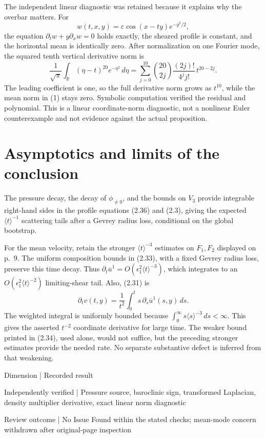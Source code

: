 \documentclass[10pt]{article}
\begin{document}
The independent linear diagnostic was retained because it explains why the overbar matters. For \[w(t,x,y)=\varepsilon\cos(x-ty)e^{-y^2/2},\] the equation \(\partial_tw+y\partial_xw=0\) holds exactly, the sheared profile is constant, and the horizontal mean is identically zero. After normalization on one Fourier mode, the squared tenth vertical derivative norm is \[\frac1{\sqrt\pi}\int_\mathbb R(\eta-t)^{20}e^{-\eta^2}\,d\eta
 =
 \sum_{j=0}^{10}\binom{20}{2j}\frac{(2j)!}{4^j j!}\,t^{20-2j}.\] The leading coefficient is one, so the full derivative norm grows as \(t^{10}\), while the mean norm in (1) stays zero. Symbolic computation verified the residual and polynomial. This is a linear coordinate-norm diagnostic, not a nonlinear Euler counterexample and not evidence against the actual proposition.\par
\section*{Asymptotics and limits of the conclusion}
The pressure decay, the decay of \(\phi_{\ne0}\), and the bounds on \(V_3\) provide integrable right-hand sides in the profile equations (2.36) and (2.3), giving the expected \(\langle t\rangle^{-1}\) scattering tails after a Gevrey radius loss, conditional on the global bootstrap.\par
For the mean velocity, retain the stronger \(\langle t\rangle^{-3}\) estimates on \(F_1,F_2\) displayed on p. 9. The uniform composition bounds in (2.33), with a fixed Gevrey radius loss, preserve this time decay. Thus \(\partial_t\overline u^1=O(\epsilon_1^2\langle t\rangle^{-3})\), which integrates to an \(O(\epsilon_1^2\langle t\rangle^{-2})\) limiting-shear tail. Also, (2.31) is \[\partial_tv(t,y)=\frac1{t^2}
                 \int_0^t s\,\partial_s\overline u^1(s,y)\,ds.\] The weighted integral is uniformly bounded because \(\int_0^\infty s\langle s\rangle^{-3}\,ds<\infty\). This gives the asserted \(t^{-2}\) coordinate derivative for large time. The weaker bound printed in (2.34), used alone, would not suffice, but the preceding stronger estimates provide the needed rate. No separate substantive defect is inferred from that weakening.\par
Dimension | Recorded result\par
Independently verified | Pressure source, baroclinic sign, transformed Laplacian, density multiplier derivative, exact linear norm diagnostic\par
Review outcome | No Issue Found within the stated checks; mean-mode concern withdrawn after original-page inspection\par
\end{document}
